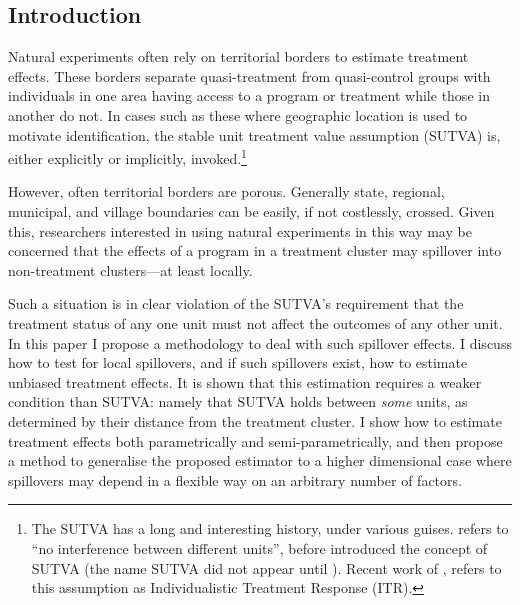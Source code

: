 \documentclass{article}
\begin{document}
\newpage
\begin{spacing}{1.1}
\section{Introduction}
Natural experiments often rely on territorial borders to estimate treatment 
effects.  These borders separate quasi-treatment from quasi-control groups with
individuals in one area having access to a program or treatment while those in 
another do not.  In cases such as these where geographic location is used to 
motivate identification, the stable unit treatment value assumption (SUTVA) is, 
either explicitly or implicitly, invoked.\footnote{The SUTVA has a long and 
interesting history, under various guises. \citet{Cox1958} refers to ``no 
interference between different units'', before \citet{Rubin1978} introduced the 
concept of SUTVA (the name SUTVA did not appear until \citet{Rubin1980}).  
Recent work of \citet{Manski2013}, refers to this assumption as Individualistic 
Treatment Response (ITR).}

However, often territorial borders are porous.  Generally state, regional,
municipal, and village boundaries can be easily, if not costlessly, crossed.
Given this, researchers interested in using natural experiments in this way may
be concerned that the effects of a program in a treatment cluster may spillover 
into non-treatment clusters---at least locally.

Such a situation is in clear violation of the SUTVA's requirement that the treatment
status of any one unit must not affect the outcomes of any other unit.  In this 
paper I propose a methodology to deal with such spillover effects.  I
discuss how to test for local spillovers, and if such spillovers exist, how to 
estimate unbiased treatment effects.  It is shown that this estimation requires
a weaker condition than SUTVA: namely that SUTVA holds between \emph{some} units, 
as determined by their distance from the treatment cluster.  I show how to 
estimate treatment effects both parametrically and semi-parametrically, and then
propose a method to generalise the proposed estimator to a higher dimensional 
case where spillovers may depend in a flexible way on an arbitrary number of 
factors.


\end{spacing}
\end{document}
